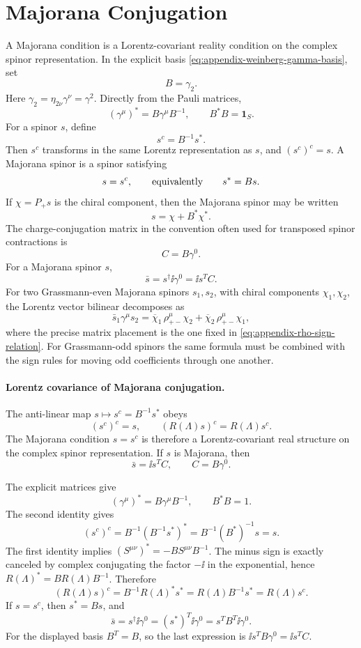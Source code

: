 \section{Majorana Conjugation}

\begin{definition}
\label{def:majorana-conjugation-weinberg-basis}
A Majorana condition is a Lorentz-covariant reality condition on the complex
spinor representation.  In the explicit basis
\eqref{eq:appendix-weinberg-gamma-basis}, set
\begin{equation}
  B=\gamma_2 .
  \label{eq:appendix-majorana-B}
\end{equation}
Here \(\gamma_2=\eta_{2\nu}\gamma^\nu=\gamma^2\).  Directly from the Pauli
matrices,
\[
  (\gamma^\mu)^*=B\gamma^\mu B^{-1},
  \qquad
  B^*B=\mathbf 1_S .
\]
For a spinor \(s\), define
\[
  s^c=B^{-1}s^* .
\]
Then \(s^c\) transforms in the same Lorentz representation as \(s\), and
\((s^c)^c=s\).  A Majorana spinor is a spinor satisfying
\[
  s=s^c,
  \qquad\hbox{equivalently}\qquad
  s^*=Bs .
\]
If \(\chi=P_+s\) is the chiral component, then the Majorana spinor may be
written
\[
  s=\chi+B^*\chi^* .
\]
The charge-conjugation matrix in the convention often used for transposed
spinor contractions is
\[
  C=B\gamma^0 .
\]
For a Majorana spinor \(s\),
\[
  \bar s=s^\dagger\ii\gamma^0
  =
  \ii s^T C .
\]
For two Grassmann-even Majorana spinors \(s_1,s_2\), with chiral components
\(\chi_1,\chi_2\), the Lorentz vector bilinear decomposes as
\[
  \bar s_1\gamma^\mu s_2
  =
  \overline\chi_1\,\rho^\mu_{+-}\chi_2
  +
  \overline\chi_2\,\rho^\mu_{+-}\chi_1,
\]
where the precise matrix placement is the one fixed in
\eqref{eq:appendix-rho-sign-relation}.  For Grassmann-odd spinors the same
formula must be combined with the sign rules for moving odd coefficients
through one another.
\end{definition}

\paragraph{Lorentz covariance of Majorana conjugation.}
The anti-linear map \(s\mapsto s^c=B^{-1}s^*\) obeys
\[
  (s^c)^c=s,
  \qquad
  (R(\Lambda)s)^c=R(\Lambda)s^c .
\]
The Majorana condition \(s=s^c\) is therefore a Lorentz-covariant real
structure on the complex spinor representation.  If \(s\) is Majorana, then
\[
  \bar s=\ii s^T C,\qquad C=B\gamma^0 .
\]

The explicit matrices give
\[
  (\gamma^\mu)^*=B\gamma^\mu B^{-1},
  \qquad
  B^*B=1.
\]
The second identity gives
\[
  (s^c)^c
  =
  B^{-1}(B^{-1}s^*)^*
  =
  B^{-1}(B^*)^{-1}s
  =
  s.
\]
The first identity implies
\((S^{\mu\nu})^*=-B S^{\mu\nu}B^{-1}\).  The minus sign is exactly canceled
by complex conjugating the factor \(-\ii\) in the exponential, hence
\(R(\Lambda)^*=B R(\Lambda)B^{-1}\).  Therefore
\[
  (R(\Lambda)s)^c
  =
  B^{-1}R(\Lambda)^*s^*
  =
  R(\Lambda)B^{-1}s^*
  =
  R(\Lambda)s^c .
\]
If \(s=s^c\), then \(s^*=Bs\), and
\[
  \bar s=s^\dagger\ii\gamma^0
  =
  (s^*)^T\ii\gamma^0
  =
  s^T B^T\ii\gamma^0.
\]
For the displayed basis \(B^T=B\), so the last expression is
\(\ii s^T B\gamma^0=\ii s^T C\).

